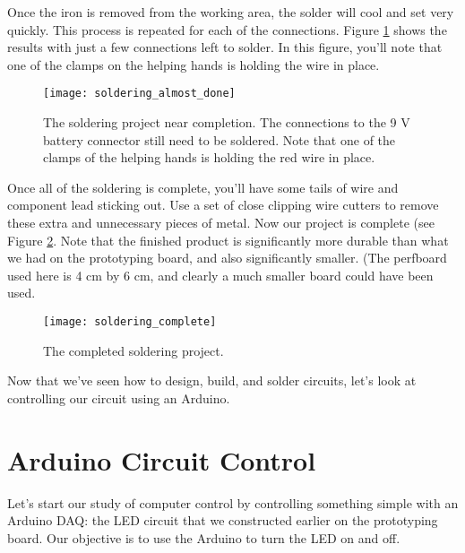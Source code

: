 Once the iron is removed from the working area, the solder will cool and set
very quickly.
This process is repeated for each of the
connections. Figure \ref{fig:soldering_almost_done} shows the results with just
a few connections left to solder. In this figure, you'll note that one of the
clamps on the helping hands is holding the wire in place.
\begin{figure}[htbp!]
\centering
\texttt{[image: soldering\_almost\_done]}
\caption[Soldering project near completion]{The soldering project near 
completion. The connections to the 9 V battery connector still need to be
soldered. Note that one of the clamps of the helping hands is holding the red
wire in place.}
\label{fig:soldering_almost_done}
\end{figure}

Once all of the soldering is complete, you'll have some tails of wire and
component lead sticking out. Use a set of close clipping wire cutters to remove
these extra and unnecessary pieces of metal. Now our project is complete
(see Figure \ref{fig:soldering_complete}. Note that the finished product is
significantly more durable than what we had on the prototyping board, and also
significantly smaller. (The perfboard used here is 4 cm by 6 cm, and clearly a much smaller board could have been used.

\begin{figure}[htbp!]
\centering
\texttt{[image: soldering\_complete]}
\caption[The completed soldering project]{The completed soldering project.}
\label{fig:soldering_complete}
\end{figure}


Now that we've seen how to design, build, and solder circuits, let's look at
controlling our circuit using an Arduino.


\section{Arduino Circuit Control}

Let's start our study of computer control by controlling something simple
with an Arduino DAQ: the LED circuit that we constructed earlier on the
prototyping board. Our objective is to use the Arduino to turn the LED on and 
off. 

